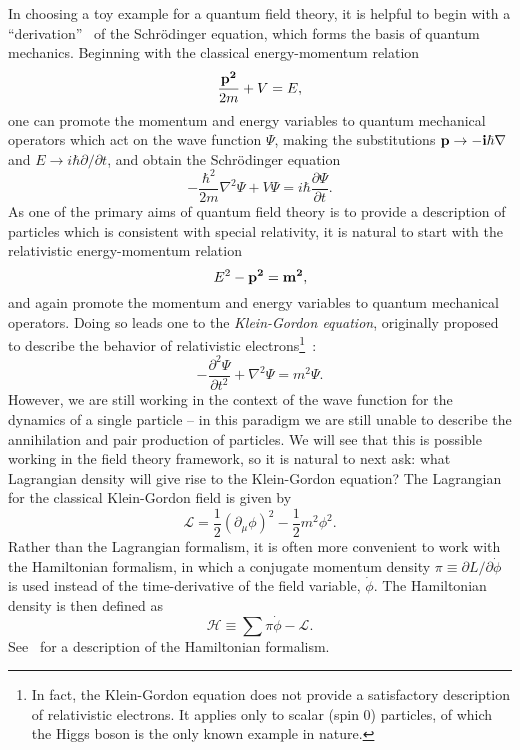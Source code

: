 In choosing a toy example for a quantum field theory, it is helpful to begin with a ``derivation''~\cite{Griffiths:2008zz} of the Schr{\"o}dinger equation, which forms the basis of quantum mechanics.
Beginning with the classical energy-momentum relation
\begin{equation}
    \frac{\bf{p}^2}{2m} + V = E,
\end{equation}
one can promote the momentum and energy variables to quantum mechanical operators which act on the wave function $\Psi$, making the substitutions $\bf{p} \to -i\hbar\nabla$ and $E \to i\hbar \partial/\partial t$, and obtain the Schr{\"o}dinger equation
\begin{equation}
    - \frac{\hbar^2}{2m} \nabla^2 \Psi + V \Psi = i\hbar \frac{\partial \Psi}{\partial t}.
\end{equation}
As one of the primary aims of quantum field theory is to provide a description of particles which is consistent with special relativity, it is natural to start with the relativistic energy-momentum relation
\begin{equation}
    E^2 - \bf{p}^2 = m^2,
\end{equation}
and again promote the momentum and energy variables to quantum mechanical operators.
Doing so leads one to the \emph{Klein-Gordon equation}, originally proposed to describe the behavior of relativistic electrons\footnote{In fact, the Klein-Gordon equation does not provide a satisfactory description of relativistic electrons. It applies only to scalar (spin 0) particles, of which the Higgs boson is the only known example in nature.}~\cite{Klein:kge,Gordon:kge}:
\begin{equation}
    -\frac{\partial^2 \Psi}{\partial t^2} + \nabla^2 \Psi = m^2 \Psi.
\end{equation}
However, we are still working in the context of the wave function for the dynamics of a single particle -- in this paradigm we are still unable to describe the annihilation and pair production of particles.
We will see that this is possible working in the field theory framework, so it is natural to next ask: what Lagrangian density will give rise to the Klein-Gordon equation?
The Lagrangian for the classical Klein-Gordon field is given by
\begin{equation} \label{eqn:classical_kg}
    \mathcal L = \frac{1}{2} (\partial_\mu \phi)^2 - \frac{1}{2} m^2 \phi^2.
\end{equation}
Rather than the Lagrangian formalism, it is often more convenient to work with the Hamiltonian formalism, in which a conjugate momentum density $\pi \equiv \partial L/\partial \dot{\phi}$ is used instead of the time-derivative of the field variable, $\dot{\phi}$.
The Hamiltonian density is then defined as
\begin{equation}
    \mathcal H \equiv \sum \pi \dot{\phi} - \mathcal L.
\end{equation}
See~\cite{Fetter:cm} for a description of the Hamiltonian formalism. 

